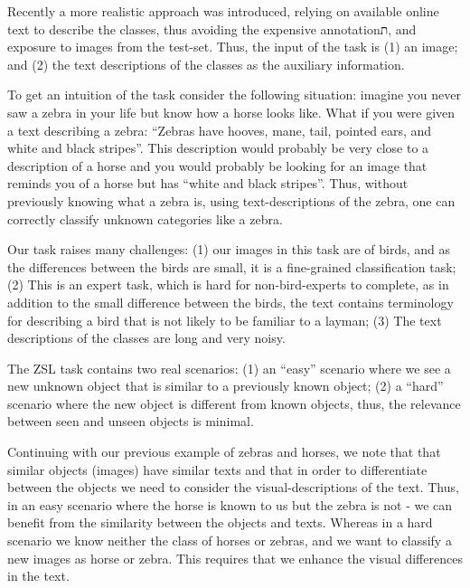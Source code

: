 \documentclass[11pt,a4paper]{article}
\begin{document}




Recently a more 
realistic
approach was introduced, relying on available online text to describe the classes, thus avoiding the expensive annotationת, and exposure to images from the test-set.
Thus, the input of the task is (1) an image; and (2) the text descriptions of the classes as the auxiliary information. \par

To get an intuition of the task consider the following situation:
imagine you never saw a zebra in your life but know how a horse looks like. What if you were given a text describing a zebra: \enquote{Zebras have hooves, mane, tail, pointed ears, and white and black stripes}. This description would probably be very close to a description of a horse and you would probably be looking for an image that reminds you of a horse but has \enquote{white and black stripes}. Thus, without previously knowing what a zebra is, using text-descriptions of the zebra, one can correctly classify unknown categories like a zebra.

Our task raises many challenges: (1) our images in this task are of birds, and as the differences between the birds are small, it is a fine-grained classification task; (2) This is an expert task, which is hard for non-bird-experts to complete, as in addition to the small difference between the birds, the text contains terminology for describing a bird that is not likely to be familiar to a layman;
(3) The text descriptions of the classes are long and very noisy. \par 


The ZSL task contains two real scenarios: (1) an \enquote{easy} scenario where we see a new unknown object that is similar to a previously known object; (2) a \enquote{hard} scenario where the new object is different from known objects, thus, the relevance between seen and unseen objects is minimal.\par

Continuing with our previous example of zebras and horses, we note that that similar objects (images) have similar texts and that in order to differentiate between the objects we need to consider the visual-descriptions of the text.  Thus, in an easy scenario where the horse is known to us but the zebra is not - we can benefit from the similarity between the objects and texts. Whereas in a hard scenario we know neither the class of horses or zebras, and we want to classify a new images as horse or zebra. This requires that we enhance the visual differences in the text.\par
\end{document}
